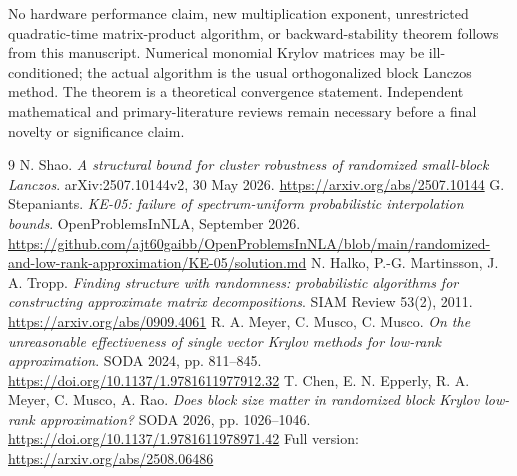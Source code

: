 \documentclass[11pt]{article}
\begin{document}
No hardware performance claim, new multiplication exponent, unrestricted
quadratic-time matrix-product algorithm, or backward-stability theorem
follows from this manuscript. Numerical monomial Krylov matrices may be
ill-conditioned; the actual algorithm is the usual orthogonalized block
Lanczos method. The theorem is a theoretical convergence statement.
Independent mathematical and primary-literature reviews remain necessary
before a final novelty or significance claim.

\begin{thebibliography}{9}
 N. Shao.
\emph{A structural bound for cluster robustness of randomized small-block
Lanczos}. arXiv:2507.10144v2, 30 May 2026.
\url{https://arxiv.org/abs/2507.10144}
 G. Stepaniants.
\emph{KE-05: failure of spectrum-uniform probabilistic interpolation
bounds}. OpenProblemsInNLA, September 2026.
\url{https://github.com/ajt60gaibb/OpenProblemsInNLA/blob/main/randomized-and-low-rank-approximation/KE-05/solution.md}
 N. Halko, P.-G. Martinsson, J. A. Tropp.
\emph{Finding structure with randomness: probabilistic algorithms for
constructing approximate matrix decompositions}. SIAM Review 53(2), 2011.
\url{https://arxiv.org/abs/0909.4061}
 R. A. Meyer, C. Musco, C. Musco.
\emph{On the unreasonable effectiveness of single vector Krylov methods
for low-rank approximation}. SODA 2024, pp. 811--845.
\url{https://doi.org/10.1137/1.9781611977912.32}
 T. Chen, E. N. Epperly, R. A. Meyer, C. Musco, A. Rao.
\emph{Does block size matter in randomized block Krylov low-rank
approximation?} SODA 2026, pp. 1026--1046.
\url{https://doi.org/10.1137/1.9781611978971.42}
Full version:
\url{https://arxiv.org/abs/2508.06486}
\end{thebibliography}
\end{document}
